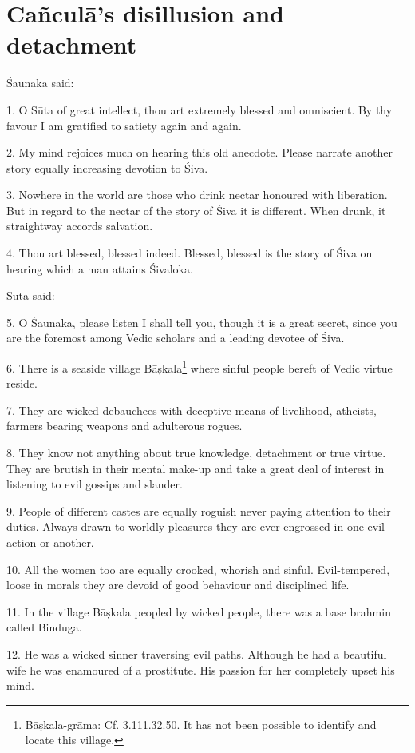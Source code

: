 \chapter{Cañculā’s disillusion and detachment}

Śaunaka said:

1. O Sūta of great intellect, thou art extremely blessed and omniscient. By thy
favour I am gratified to satiety again and again.

2. My mind rejoices much on hearing this old anecdote. Please narrate another
story equally increasing devotion to Śiva.

3. Nowhere in the world are those who drink nectar honoured with liberation. But
in regard to the nectar of the story of Śiva it is different. When drunk, it
straightway accords salvation.

4. Thou art blessed, blessed indeed. Blessed, blessed is the story of Śiva on
hearing which a man attains Śivaloka.

Sūta said:

5. O Śaunaka, please listen I shall tell you, though it is a great secret, since
you are the foremost among Vedic scholars and a leading devotee of Śiva.

6. There is a seaside village Bāṣkala\footnote{Bāṣkala-grāma: Cf.
 3.111.32.50. It has not been possible to identify and
locate this village.} where sinful people bereft of Vedic virtue reside.

7. They are wicked debauchees with deceptive means of livelihood, atheists,
farmers bearing weapons and adulterous rogues.

8. They know not anything about true knowledge, detachment or true virtue. They
are brutish in their mental make-up and take a great deal of interest in
listening to evil gossips and slander.

9. People of different castes are equally roguish never paying attention to
their duties. Always drawn to worldly pleasures they are ever engrossed in one
evil action or another.

10. All the women too are equally crooked, whorish and sinful. Evil-tempered,
loose in morals they are devoid of good behaviour and disciplined life.

11. In the village Bāṣkala peopled by wicked people, there was a base brahmin
called Binduga.

12. He was a wicked sinner traversing evil paths. Although he had a beautiful
wife he was enamoured of a prostitute. His passion for her completely upset his
mind.

